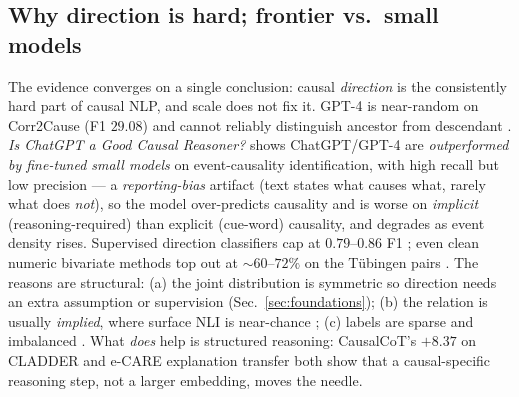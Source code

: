 \subsection{Why direction is hard; frontier vs.\ small models}
\label{sec:hardness}

The evidence converges on a single conclusion: causal \emph{direction} is the
consistently hard part of causal NLP, and scale does not fix it. GPT-4 is
near-random on Corr2Cause (F1 $29.08$) and cannot reliably distinguish
ancestor from descendant \citep{caus:jin2024corr2cause}. \emph{Is ChatGPT a Good
Causal Reasoner?} \citep{caus:gao2023chatgptcausal} shows ChatGPT/GPT-4 are
\emph{outperformed by fine-tuned small models} on event-causality identification,
with high recall but low precision --- a \emph{reporting-bias} artifact (text
states what causes what, rarely what does \emph{not}), so the model over-predicts
causality and is worse on \emph{implicit} (reasoning-required) than explicit
(cue-word) causality, and degrades as event density rises. Supervised direction
classifiers cap at $0.79$--$0.86$ F1 \citep{caus:hosseini2021directionality};
even clean numeric bivariate methods top out at $\sim$$60$--$72\%$ on the
T\"ubingen pairs \citep{found:mooij2016distinguishing}. The reasons are
structural: (a) the joint distribution is symmetric so direction needs an extra
assumption or supervision (Sec.~\ref{sec:foundations}); (b) the relation is
usually \emph{implied}, where surface NLI is near-chance \citep{caus:havaldar2025inli};
(c) labels are sparse and imbalanced \citep{caus:mirza2014causaltimebank}. What
\emph{does} help is structured reasoning: CausalCoT's $+8.37$ on CLADDER
\citep{caus:jin2023cladder} and e-CARE explanation transfer
\citep{caus:du2022ecare} both show that a causal-specific reasoning step, not a
larger embedding, moves the needle.


